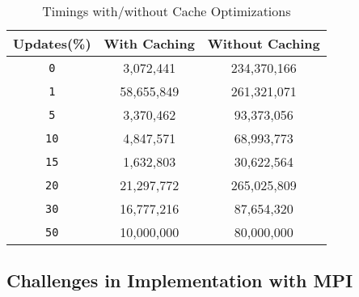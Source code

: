 \begin{table}[H]
    \centering
    \caption{Timings with/without Cache Optimizations}
    \begin{tabular}{|c|c|c|}
        \hline
        \textbf{Updates(\%)} & \textbf{With Caching} & \textbf{Without Caching} \\
        \hline
        \texttt{0} & 3,072,441 & 234,370,166 \\
        \texttt{1} & 58,655,849 & 261,321,071 \\
        \texttt{5} & 3,370,462 & 93,373,056 \\
        \texttt{10} & 4,847,571 & 68,993,773 \\
        \texttt{15} & 1,632,803 & 30,622,564 \\
        \texttt{20} & 21,297,772 & 265,025,809 \\
        \texttt{30} & 16,777,216 & 87,654,320 \\
        \texttt{50} & 10,000,000 & 80,000,000 \\
        \hline
    \end{tabular}
    \label{tab:cache_optimizations}
\end{table}

\subsection{Challenges in Implementation with MPI}\label{Subsec: Challenges in Implementation with MPI}

